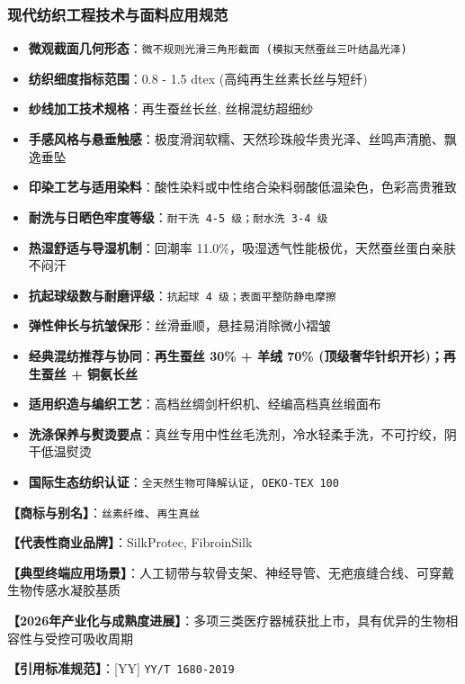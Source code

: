 \documentclass[11pt,openright,twoside,UTF8]{ctexbook}
\begin{document}
\subsubsection*{现代纺织工程技术与面料应用规范}
\begin{itemize} \setlength{\itemsep}{2pt}
    \item \textbf{微观截面几何形态}：\texttt{微不规则光滑三角形截面 (模拟天然蚕丝三叶结晶光泽)}
    \item \textbf{纺织细度指标范围}：0.8 - 1.5 dtex (高纯再生丝素长丝与短纤)
    \item \textbf{纱线加工技术规格}：再生蚕丝长丝, 丝棉混纺超细纱
    \item \textbf{手感风格与悬垂触感}：极度滑润软糯、天然珍珠般华贵光泽、丝鸣声清脆、飘逸垂坠
    \item \textbf{印染工艺与适用染料}：酸性染料或中性络合染料弱酸低温染色，色彩高贵雅致
    \item \textbf{耐洗与日晒色牢度等级}：\texttt{耐干洗 4-5 级；耐水洗 3-4 级}
    \item \textbf{热湿舒适与导湿机制}：回潮率 11.0\%，吸湿透气性能极优，天然蚕丝蛋白亲肤不闷汗
    \item \textbf{抗起球级数与耐磨评级}：\texttt{抗起球 4 级；表面平整防静电摩擦}
    \item \textbf{弹性伸长与抗皱保形}：丝滑垂顺，悬挂易消除微小褶皱
    \item \textbf{经典混纺推荐与协同}：\textbf{再生蚕丝 30\% + 羊绒 70\% (顶级奢华针织开衫)；再生蚕丝 + 铜氨长丝}
    \item \textbf{适用织造与编织工艺}：高档丝绸剑杆织机、经编高档真丝缎面布
    \item \textbf{洗涤保养与熨烫要点}：真丝专用中性丝毛洗剂，冷水轻柔手洗，不可拧绞，阴干低温熨烫
    \item \textbf{国际生态纺织认证}：\texttt{全天然生物可降解认证, OEKO-TEX 100}
\end{itemize}
\vspace{0.2cm}

\noindent\textbf{【商标与别名】}：\texttt{丝素纤维}、\texttt{再生真丝}\par
\noindent\textbf{【代表性商业品牌】}：SilkProtec, FibroinSilk\par
\noindent\textbf{【典型终端应用场景】}：人工韧带与软骨支架、神经导管、无疤痕缝合线、可穿戴生物传感水凝胶基质\par
\noindent\textbf{【2026年产业化与成熟度进展】}：多项三类医疗器械获批上市，具有优异的生物相容性与受控可吸收周期\par
\noindent\textbf{【引用标准规范】}：[YY] \texttt{YY/T 1680-2019}\par
\vspace{0.5cm}
\end{document}
